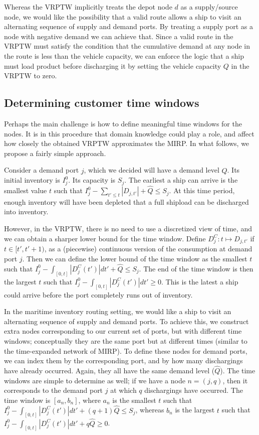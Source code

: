 \documentclass[11pt]{article}
\theoremstyle{definition}
\newcommand{\abs}[1]{\left| #1 \right|}
\newcommand{\smallsum}{{\textstyle{\sum}}}
\newcommand{\0}{\mathbf{0}}
\renewcommand{\hat}{\widehat}
\begin{document}
Whereas the VRPTW implicitly treats the depot node $d$ as a supply/source node, we would like the possibility that a valid route allows a ship to visit an alternating sequence of supply and demand ports.
By treating a supply port as a node with negative demand we can achieve that.
Since a valid route in the VRPTW must satisfy the condition that the cumulative demand at any node in the route is less than the vehicle capacity, we can enforce the logic that a ship must load product before discharging it by setting the vehicle capacity $Q$ in the VRPTW to zero.


\subsection{Determining customer time windows}

Perhaps the main challenge is how to define meaningful time windows for the nodes.
It is in this procedure that domain knowledge could play a role, and affect how closely the obtained VRPTW approximates the MIRP.
In what follows, we propose a fairly simple approach.

Consider a demand port $j$, which we decided will have a demand level $\hat{Q}$.
Its initial inventory is $I_j^0$.
Its capacity is $S_j$.
The earliest a ship can arrive is
the smallest value $t$ such that
$I_j^0 - \smallsum_{t' \le t} \abs{D_{j,t'}} + \hat{Q} \le S_j$.
At this time period, enough inventory will have been depleted that a full shipload can be discharged into inventory.

However, in the VRPTW, there is no need to use a discretized view of time, and we can obtain a sharper lower bound for the time window.
Define $D_j^C : t \mapsto D_{j,t'}$ if $t \in [t',t'+1)$, 
as a (piecewise) continuous version of the consumption at demand port $j$.
Then we can define the lower bound of the time window as the smallest $t$ such that
$I_j^0 - \int_{[0,t]} \abs{D_j^C(t')}dt' + \hat{Q} \le S_j$.
The end of the time window is then the largest $t$ such that
$I_j^0 - \int_{[0,t]} \abs{D_j^C(t')}dt' \ge 0$.
This is the latest a ship could arrive before the port completely runs out of inventory.

In the maritime inventory routing setting, we would like a ship to visit an alternating sequence of supply and demand ports.
To achieve this, we construct extra nodes corresponding to our current set of ports, but with different time windows;
conceptually they are the same port but at different times (similar to the time-expanded network of MIRP).
To define these nodes for demand ports, we can index them by the corresponding port, and by how many dischargings have already occurred.
Again, they all have the same demand level ($\hat{Q}$).
The time windows are simple to determine as well;
if we have a node $n = (j,q)$, then it corresponds to the demand port $j$ at which $q$ dischargings have occurred.
The time window is 
$[a_n,b_n]$,
where 
$a_n$ is the smallest $t$ such that
$I_j^0 - \int_{[0,t]} \abs{D_j^C(t')}dt' + (q+1)\hat{Q} \le S_j$, 
whereas 
$b_n$ is the largest $t$ such that
$I_j^0 - \int_{[0,t]} \abs{D_j^C(t')}dt' + q\hat{Q}\ge 0$.
\end{document}
